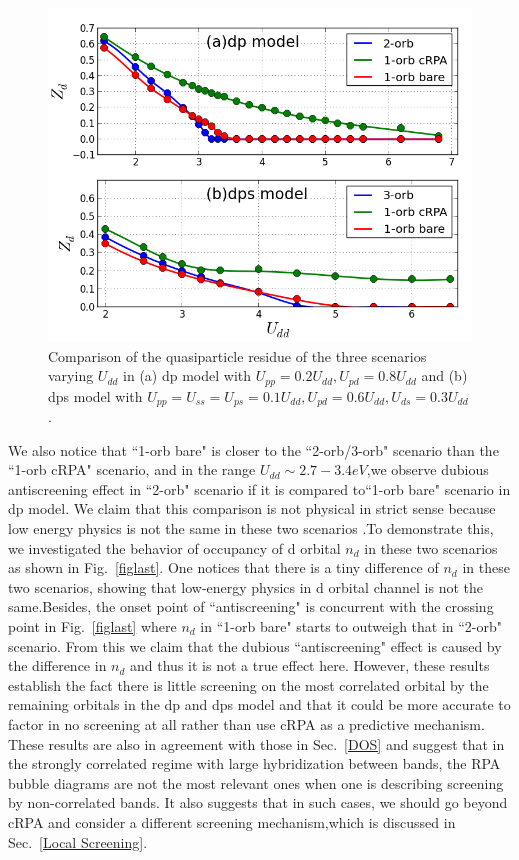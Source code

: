 \documentclass[10pt]{ruthesis}
\begin{document}
{\begin{figure}[H]
 \includegraphics[width=0.95\columnwidth]{./plotForpublishing/dp+dps_qpw.png}
 \caption{\label{fig6}Comparison of the quasiparticle residue of the three scenarios varying $U_{dd} $ in (a) dp model with $U_{pp}=0.2U_{dd},U_{pd}=0.8U_{dd}$ and (b) dps model with $U_{pp}=U_{ss}=U_{ps}=0.1U_{dd},U_{pd}=0.6U_{dd},U_{ds}=0.3U_{dd}$.}
\end{figure}



We also notice that ``1-orb bare" is closer to the ``2-orb/3-orb" scenario than the ``1-orb cRPA" scenario, and in the range $U_{dd}\sim 2.7-3.4eV$,we observe dubious antiscreening effect in ``2-orb" scenario if it is compared to``1-orb bare" scenario in dp model. We claim that this comparison is not physical in strict sense because low energy physics is not the same in these two scenarios .To demonstrate this, we investigated the behavior of occupancy of d orbital $n_d$ in these two scenarios as shown in Fig.~\ref{figlast}. One notices that there is a tiny difference of $n_d$ in these two scenarios, showing that low-energy physics in d orbital channel is not the same.Besides, the onset point of ``antiscreening" is concurrent with the  crossing point in Fig.~\ref{figlast} where $n_d$ in ``1-orb bare" starts to outweigh that in ``2-orb" scenario. From this we claim that the dubious ``antiscreening" effect is caused by the difference in $n_d$ and thus it is not a true effect here. However, these results establish the fact there is little screening on the most correlated orbital by the remaining orbitals in the dp and dps model and that it could be more accurate to factor in no screening at all rather than use cRPA as a predictive mechanism.  These results are also in agreement with those in Sec.~\ref{DOS} and suggest that in the strongly correlated regime with large hybridization between bands, the RPA bubble diagrams are not  the most relevant ones when one is describing screening by non-correlated bands. It also suggests that in such cases, we should go beyond cRPA and consider a different screening mechanism,which is discussed in Sec.~\ref{Local Screening}.


}
\end{document}
